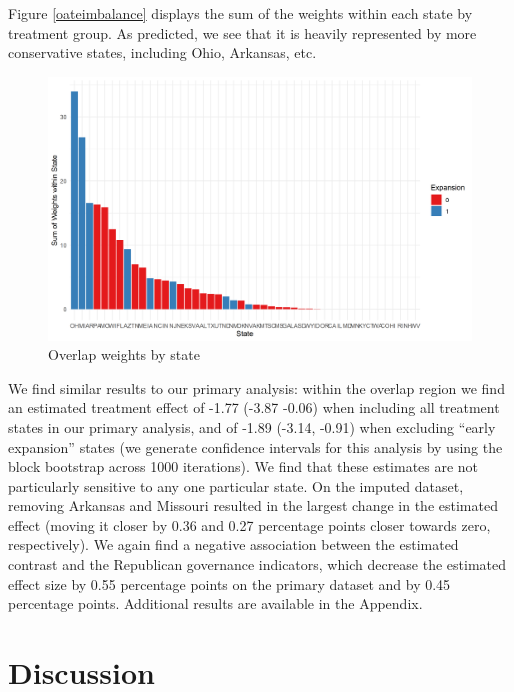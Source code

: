 \documentclass[12pt]{article}
\begin{document}
Figure \ref{oateimbalance} displays the sum of the weights within each state by treatment group. As predicted, we see that it is heavily represented by more conservative states, including Ohio, Arkansas, etc.

\begin{figure}[]
\begin{center}
    \includegraphics[scale=0.6]{01_Plots/oate-region.png}
    \caption{Overlap weights by state}
    \label{oatearea}
\end{center}
\end{figure}

We find similar results to our primary analysis: within the overlap region we find an estimated treatment effect of -1.77 (-3.87 -0.06) when including all treatment states in our primary analysis, and of -1.89 (-3.14, -0.91) when excluding ``early expansion'' states (we generate confidence intervals for this analysis by using the block bootstrap across 1000 iterations). We find that these estimates are not particularly sensitive to any one particular state. On the imputed dataset, removing Arkansas and Missouri resulted in the largest change in the estimated effect (moving it closer by 0.36 and 0.27 percentage points closer towards zero, respectively). We again find a negative association between the estimated contrast and the Republican governance indicators, which decrease the estimated effect size by 0.55 percentage points on the primary dataset and by 0.45 percentage points. Additional results are available in the Appendix.

\section{Discussion}
\end{document}

